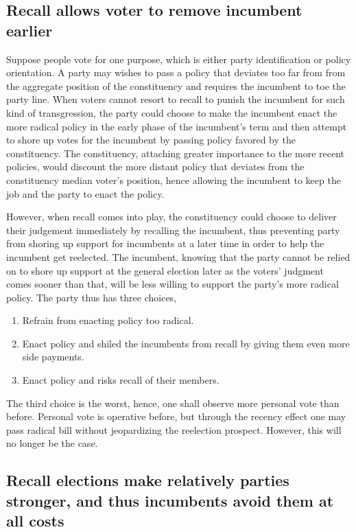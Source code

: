 \documentclass[hyphens, crop=false]{standalone}
\begin{document}
		\subsection*{Recall allows voter to remove incumbent earlier}
		Suppose people vote for one purpose,
		which is either party identification or policy orientation.
		A party may wishes to pass a policy
		that deviates too far from from the aggregate position of the constituency
		and requires the incumbent to toe the party line.
		When voters cannot resort to recall to punish the incumbent for
		such kind of transgression,
		the party could choose to make the incumbent enact the more radical policy
		in the early phase of the incumbent's term
		and then attempt to shore up votes for the incumbent
		by passing policy favored by the constituency.
		The constituency, attaching greater importance to the more recent policies,
		would discount the more distant policy that deviates from the constituency median voter's position,
		hence allowing the incumbent to keep the job and the party to enact the policy.
		
		However, when recall comes into play,
		the constituency could choose to
		deliver their judgement immediately by recalling the incumbent,
		thus preventing party from shoring up support for incumbents at a later time
		in order to help the incumbent get reelected.
		The incumbent, knowing
		that the party cannot be relied on to shore up support at the general election later
		as the voters' judgment comes sooner than that, will be less willing to support the party's more radical policy.
		The party thus has three choices,
		\begin{enumerate}
			\item 
			Refrain from enacting policy too radical.
			\item 
			Enact policy and shiled the incumbents from recall by giving them even more side payments.
			\item 
			Enact policy and risks recall of their members.
		\end{enumerate}
		The third choice is the worst, hence, one shall observe more personal vote than before.
		Personal vote is operative before, but through the recency effect
		one may pass radical bill without jeopardizing the reelection prospect.
		However, this will no longer be the case.
		
		\subsection*{Recall elections make relatively parties stronger, and thus incumbents avoid them at all costs}
		
\end{document}
